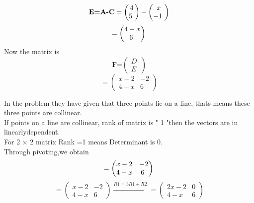 \documentclass[10pt, a4paper]{article}
\begin{document}
\begin{equation}\label{eq:}
\textbf{E=A-C}\\
=\begin{pmatrix} 4\\ 5\ \end{pmatrix}- \begin{pmatrix} x\\ -1\ \end{pmatrix}
\end{equation}
\begin{equation}\label{eq:}
=\begin{pmatrix} 4-x\\ 6\ \end{pmatrix}\\
\end{equation}
\boldmath
Now the matrix is\\
\begin{equation}\label{eq:}
\textbf{F=$\begin{pmatrix} D\\ E\ \end{pmatrix}$}
\end{equation}
\unboldmath
\begin{equation} \label{eq:}
=\begin{pmatrix} x-2 & -2\\ 4-x & 6 \ \end{pmatrix} 
\end{equation}

In the problem they have given that three points lie on a line, thats means these three points are collinear.\\

If  points on a line  are  collinear, rank of matrix is " 1 "then the vectors are in linearlydependent.\\
For 2 × 2 matrix Rank =1 means Determinant is 0.\\

Through pivoting,we obtain\\
\begin{equation}\label{eq:}
=\begin{pmatrix} x-2 & -2\\ 4-x & 6 \ \end{pmatrix} \\ 
\end{equation}
\begin{equation}\label{eq:}
=\begin{pmatrix}
x-2 &-2 \\ 
 4-x& 6
\end{pmatrix}\overset{R1=3R1+R2}{\rightarrow}
=\begin{pmatrix}
2x-2 &0 \\ 
 4-x& 6
\end{pmatrix}
\end{equation} 
\end{document}
